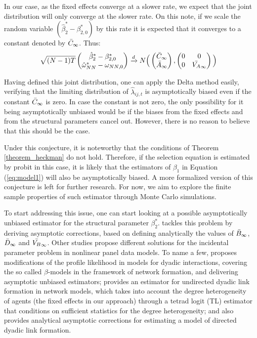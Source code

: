 In our case, as the fixed effects converge at a slower rate, we expect that the joint distribution will only converge at the slower rate. On this note, if we scale the random variable $(\hat{\beta}_2^* - \beta_{2,0}^*)$ by this rate it is expected that it converges to a constant denoted by $\Bar{C}_\infty$. Thus:
\begin{align*}
    \sqrt{(N-1)T} \begin{pmatrix}
        \hat{\beta}_2^* - \beta_{2,0}^* \\
        \hat{\omega}_{NN}^* - \omega_{NN,0} 
    \end{pmatrix}
    \xrightarrow{d} N \Big( 
    \begin{pmatrix}
        \Bar{C}_\infty \\
        \Bar{A}_\infty 
    \end{pmatrix} ,
    \begin{pmatrix}
        0 & 0 \\
        0 & \Bar{V_A}_\infty
    \end{pmatrix} \Big)
\end{align*}

Having defined this joint distribution, one can apply the Delta method easily, verifying that the limiting distribution of $\hat{\lambda}_{ij,t}$ is asymptotically biased even if the constant $\Bar{C}_\infty$ is zero. In case the constant is not zero, the only possibility for it being asymptotically unbiased would be if the biases from the fixed effects and from the structural parameters cancel out. However, there is no reason to believe that this should be the case. 

Under this conjecture, it is noteworthy that the conditions of Theorem \ref{theorem_heckman} do not hold. Therefore, if the selection equation is estimated by probit in this case, it is likely that the estimators of $\beta_1$ in Equation (\ref{eq:model1}) will also be asymptotically biased. A more formalized version of this conjecture is left for further research. For now, we aim to explore the finite sample properties of such estimator through Monte Carlo simulations.

To start addressing this issue, one can start looking at a possible asymptotically unbiased estimator for the structural parameter $\beta_2^*$. \cite{fernandez2016individual} tackles this problem by deriving asymptotic corrections, based on defining analytically the values of $\Bar{B}_\infty$, $\Bar{D}_\infty$ and $\Bar{V_B}_\infty$. Other studies propose different solutions for the incidental parameter problem in nonlinear panel data models. 
To name a few, \cite{jochmans2019modified} proposes modifications of the profile likelihood in models for dyadic interactions, covering the so called $\beta$-models in the framework of network formation, and delivering asymptotic unbiased estimators; \cite{graham2017econometric} provides an estimator for undirected dyadic link formation in network models, which takes into account the degree heterogeneity of agents (the fixed effects in our approach) through a tetrad logit (TL) estimator that conditions on sufficient statistics for the degree heterogeneity; and \cite{dzemski2019empirical} also provides analytical asymptotic corrections for estimating a model of directed dyadic link formation.

